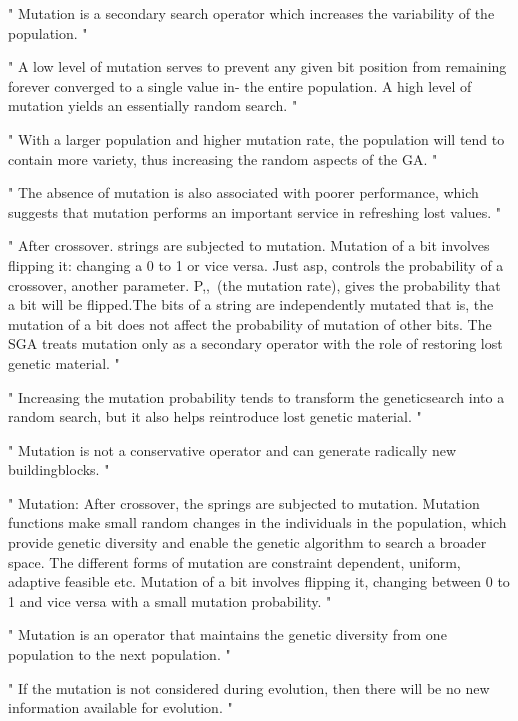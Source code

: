 "
Mutation is a secondary search operator which increases the variability of the population.
"\cite{grefenstette_optimization_1986}

"
A low level of mutation serves to prevent any given bit position from remaining forever converged to a single value in- the entire population. A high level of mutation yields an essentially random search.
"\cite{grefenstette_optimization_1986}

"
With a larger population and higher mutation rate, the population will tend to contain more variety, thus increasing the random aspects of the GA.
"\cite{grefenstette_optimization_1986}

"
The absence of mutation is also associated with poorer performance, which suggests that mutation performs an important service in refreshing lost values.
"\cite{grefenstette_optimization_1986}

"
After crossover. strings are subjected to mutation. Mutation of a bit involves flipping it: changing a 0 to 1 or vice versa. Just asp, controls the probability of a crossover, another parameter. P,,~(the mutation rate), gives the probability that a bit will be flipped.The bits of a string are independently mutated that is, the mutation of a bit does not affect the probability of mutation of other bits. The SGA treats mutation only as a secondary operator with the role of restoring lost genetic material.
"\cite{srinivas_genetic_1994}

"
Increasing the mutation probability tends to transform the geneticsearch into a random search, but it also helps reintroduce lost genetic material.
"\cite{srinivas_genetic_1994}

"
Mutation is not a conservative operator and can generate radically new buildingblocks.
"\cite{srinivas_genetic_1994}


"
Mutation: After crossover, the springs are subjected to mutation. Mutation functions make small random changes in the individuals in the population, which provide genetic diversity and enable the genetic algorithm to search a broader space. The different forms of mutation are constraint dependent, uniform, adaptive feasible etc. Mutation of a bit involves flipping it, changing between 0 to 1 and vice versa with a small mutation probability.
"\cite{majumdar_genetic_2015}

"
Mutation is an operator that maintains the genetic diversity from one population to the next population.
"\cite{katoch_review_2021}

"
If the mutation is not considered during evolution, then there will be no new information available for evolution.
"\cite{katoch_review_2021}

